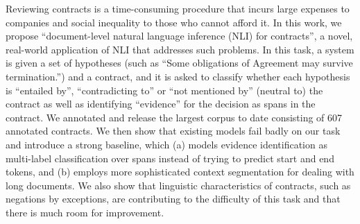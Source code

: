 Reviewing contracts is a time-consuming procedure that incurs large expenses to companies and social inequality to those who cannot afford it. In this work, we propose ``document-level natural language inference (NLI) for contracts'', a novel, real-world application of NLI that addresses such problems. In this task, a system is given a set of hypotheses (such as ``Some obligations of Agreement may survive termination.'') and a contract, and it is asked to classify whether each hypothesis is ``entailed by'', ``contradicting to'' or ``not mentioned by'' (neutral to) the contract as well as identifying ``evidence'' for the decision as spans in the contract. We annotated and release the largest corpus to date consisting of 607 annotated contracts. We then show that existing models fail badly on our task and introduce a strong baseline, which (a) models evidence identification as multi-label classification over spans instead of trying to predict start and end tokens, and (b) employs more sophisticated context segmentation for dealing with long documents. We also show that linguistic characteristics of contracts, such as negations by exceptions, are contributing to the difficulty of this task and that there is much room for improvement.
